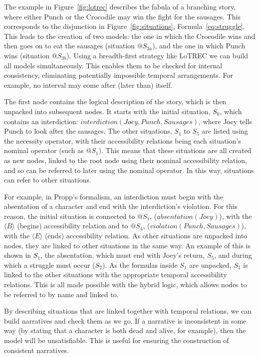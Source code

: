 \documentclass[11pt]{report}
\begin{document}
The example in Figure~\ref{fig:lotrec} describes the fabula of a branching story, where either Punch or the Crocodile may win the fight for the sausages. This corresponds to the disjunction in Figure~\ref{fig:situations}, Formula~\ref{eq:struggle}. This leads to the creation of two models: the one in which the Crocodile wins and then goes on to eat the sausages (situation $@S_{3a}$), and the one in which Punch wins (situation $@S_{3b}$).
Using a breadth-first strategy like LoTREC we can build all models simultaneously. This enables them to be checked for internal consistency, eliminating potentially impossible temporal arrangements. For example, no interval may come after (later than) itself.

The first node contains the logical description of the story, which is then unpacked into subsequent nodes. It starts with the initial situation, $S_0$, which contains an interdiction: $\mathit{interdiction(Joey, Punch, Sausages)}$, where Joey tells Punch to look after the sausages. The other situations, $S_1$ to $S_5$ are listed using the necessity operator, with their accessibility relations being each situation's nominal operator (such as $@S_1$). This means that these situations are all created as new nodes, linked to the root node using their nominal accessibility relation, and so can be referred to later using the nominal operator. In this way, situations can refer to other situations.

For example, in Propp's formalism, an interdiction must begin with the absentation of a character and end with the interdiction's violation. For this reason, the initial situation is connected to $@S_1$, ($\mathit{absentation(Joey)}$), with the $\langle B \rangle$ (begins) accessibility relation and to $@S_4$, ($\mathit{violation(Punch, Sausages)}$), with the $\langle E \rangle$ (ends) accessibility relation. As other situations are unpacked into nodes, they are linked to other situations in the same way. An example of this is shown in $S_1$, the absentation, which must end with Joey's return, $S_5$, and during which a struggle must occur ($S_2$). As the formulas inside $S_1$ are unpacked, $S_1$ is linked to the other situations with the appropriate temporal accessibility relations. This is all made possible with the hybrid logic, which allows nodes to be referred to by name and linked to.

By describing situations that are linked together with temporal relations, we can build narratives and check them as we go. If a narrative is inconsistent in some way (by stating that a character is both dead and alive, for example), then the model will be unsatisfiable. This is useful for ensuring the construction of consistent narratives.
\end{document}
